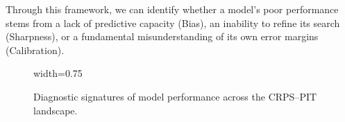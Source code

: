 Through this framework, we can identify whether a model’s poor performance stems from a lack of predictive capacity (Bias), an inability to refine its search (Sharpness), or a fundamental misunderstanding of its own error margins (Calibration).

\begin{figure}[!htbp]
  \centering
  \begin{adjustbox}{width=0.75\linewidth}
      
  \end{adjustbox}
  \caption[Diagnostic Signatures of CRPS and PIT Calibration]{Diagnostic signatures of model performance across the CRPS--PIT landscape.}
  \label{fig:diagnostic_signatures_grid}
\end{figure}





